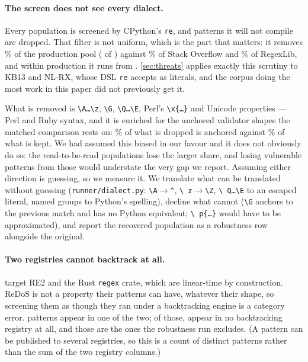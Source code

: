\documentclass[11pt]{article}
\begin{document}
\paragraph{The screen does not see every dialect.} Every population is
screened by CPython's \texttt{re}, and patterns it will not compile are
dropped. That filter is not uniform, which is the part that matters: it
removes \proddroppedpct{}\% of the production pool (\proddropped{} of
\prodpool{}) against \sodroppedpct{}\% of Stack Overflow and
\libdroppedpct{}\% of RegexLib, and within production it runs from
\droprange{}. \cref{sec:threats} applies exactly this scrutiny to KB13 and
NL-RX, whose DSL \texttt{re} accepts as literals, and the corpus doing the
most work in this paper did not previously get it.

What is removed is \texttt{\textbackslash A\ldots\textbackslash z},
\texttt{\textbackslash G}, \texttt{\textbackslash Q\ldots\textbackslash E},
Perl's \texttt{\textbackslash x\{\ldots\}} and Unicode properties --- Perl and
Ruby syntax, and it is enriched for the anchored validator shapes the matched
comparison rests on: \dropanchoredpct{}\% of what is dropped is anchored
against \keptanchoredpct{}\% of what is kept. We had assumed this biased in
our favour and it does not
obviously do so: the read-to-be-read populations lose the larger share, and
losing vulnerable patterns from those would understate the very gap we report.
Assuming either direction is guessing, so we measure it. We translate what
can be translated without guessing (\texttt{runner/dialect.py}:
\texttt{\textbackslash A}$\to$\texttt{\^{}}, \texttt{\textbackslash
z}$\to$\texttt{\textbackslash Z}, \texttt{\textbackslash
Q\ldots\textbackslash E} to an escaped literal, named groups to Python's
spelling), decline what cannot (\texttt{\textbackslash G} anchors to the
previous match and has no Python equivalent; \texttt{\textbackslash
p\{\ldots\}} would have to be approximated), and report the recovered
population as a robustness row alongside the original.

\paragraph{Two registries cannot backtrack at all.} \linearregistries{} target
RE2 and the Rust \texttt{regex} crate, which are linear-time by construction.
ReDoS is not a property their patterns can have, whatever their shape, so
screening them as though they ran under a backtracking engine is a category
error. \linearpatterns{} patterns appear in one of the two; of those,
\linearonly{} appear in no backtracking registry at all, and those are the
ones the robustness run excludes. (A pattern can be published to several
registries, so this is a count of distinct patterns rather than the sum of the
two registry columns.)
\end{document}
